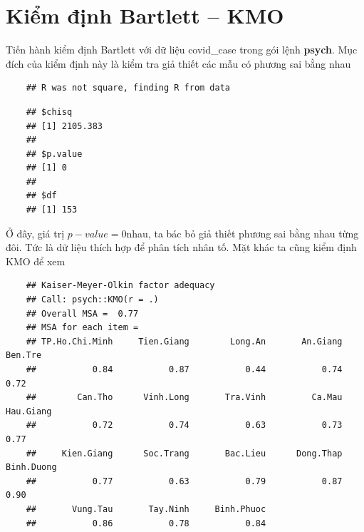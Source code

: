 \documentclass[../thesis.tex]{subfiles}
\begin{document}
\newpage
\section{Kiểm định Bartlett -- KMO}

Tiến hành kiểm định Bartlett với dữ liệu \textsf{covid\_case} trong gói lệnh \textbf{psych}. Mục đích của kiểm định này là kiểm tra giả thiết các mẫu có phương sai bằng nhau 
\begin{Shaded}
	\begin{Highlighting}[]
\SpecialCharTok{\%\textgreater{}\%}\SpecialCharTok{::}\NormalTok{()}
	\end{Highlighting}
\end{Shaded}

\begin{verbatim}
	## R was not square, finding R from data
\end{verbatim}

\begin{verbatim}
	## $chisq
	## [1] 2105.383
	## 
	## $p.value
	## [1] 0
	## 
	## $df
	## [1] 153
\end{verbatim}

Ở đây, giá trị $ p-value = 0 $nhau, ta bác bỏ giả thiết phương sai bằng nhau từng đôi. Tức là dữ liệu thích hợp để phân tích nhân tố. Mặt khác ta cũng kiểm định KMO để xem 


\begin{Shaded}
	\begin{Highlighting}[]
\SpecialCharTok{\%\textgreater{}\%}\SpecialCharTok{::}\NormalTok{()}
	\end{Highlighting}
\end{Shaded}

\begin{verbatim}
	## Kaiser-Meyer-Olkin factor adequacy
	## Call: psych::KMO(r = .)
	## Overall MSA =  0.77
	## MSA for each item = 
	## TP.Ho.Chi.Minh     Tien.Giang        Long.An       An.Giang        Ben.Tre 
	##           0.84           0.87           0.44           0.74           0.72 
	##        Can.Tho      Vinh.Long       Tra.Vinh         Ca.Mau      Hau.Giang 
	##           0.72           0.74           0.63           0.73           0.77 
	##     Kien.Giang      Soc.Trang       Bac.Lieu      Dong.Thap     Binh.Duong 
	##           0.77           0.63           0.79           0.87           0.90 
	##       Vung.Tau       Tay.Ninh     Binh.Phuoc 
	##           0.86           0.78           0.84
\end{verbatim}
\end{document}
